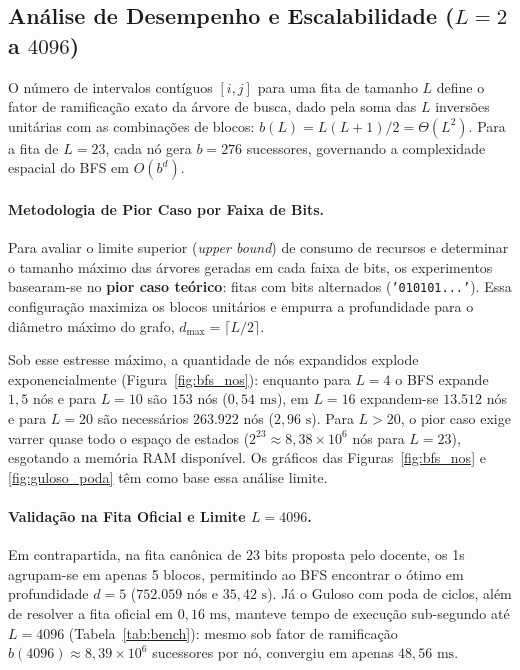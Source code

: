 \documentclass[
	12pt,
	a4paper,
	article,
	twocolumn,
	brazil
]{abntex2}
\begin{document}
\subsection{Análise de Desempenho e Escalabilidade (\texorpdfstring{$L = 2$ a $4096$}{L=2 a 4096})}

O número de intervalos contíguos $[i, j]$ para uma fita de tamanho $L$ define o fator de ramificação exato da árvore de busca, dado pela soma das $L$ inversões unitárias com as combinações de blocos: $b(L) = L(L+1)/2 = \Theta(L^2)$. Para a fita de $L = 23$, cada nó gera $b = 276$ sucessores, governando a complexidade espacial do BFS em $O(b^d)$.

\paragraph{Metodologia de Pior Caso por Faixa de Bits.}
Para avaliar o limite superior (\textit{upper bound}) de consumo de recursos e determinar o tamanho máximo das árvores geradas em cada faixa de bits, os experimentos basearam-se no \textbf{pior caso teórico}: fitas com bits alternados (\texttt{'010101...'}). Essa configuração maximiza os blocos unitários e empurra a profundidade para o diâmetro máximo do grafo, $d_{\max} = \lceil L/2 \rceil$.

Sob esse estresse máximo, a quantidade de nós expandidos explode exponencialmente (Figura~\ref{fig:bfs_nos}): enquanto para $L=4$ o BFS expande $1{,}5$ nós e para $L=10$ são $153$ nós ($0{,}54\text{ ms}$), em $L=16$ expandem-se $13.512$ nós e para $L=20$ são necessários $263.922$ nós ($2{,}96\text{ s}$). Para $L > 20$, o pior caso exige varrer quase todo o espaço de estados ($2^{23} \approx 8{,}38 \times 10^6$ nós para $L=23$), esgotando a memória RAM disponível. Os gráficos das Figuras~\ref{fig:bfs_nos} e \ref{fig:guloso_poda} têm como base essa análise limite.

\paragraph{Validação na Fita Oficial e Limite \texorpdfstring{$L = 4096$}{L=4096}.}
Em contrapartida, na fita canônica de $23$ bits proposta pelo docente, os 1s agrupam-se em apenas 5 blocos, permitindo ao BFS encontrar o ótimo em profundidade $d = 5$ ($752.059$ nós e $35{,}42\text{ s}$). Já o Guloso com poda de ciclos, além de resolver a fita oficial em $0{,}16\text{ ms}$, manteve tempo de execução sub-segundo até $L = 4096$ (Tabela~\ref{tab:bench}): mesmo sob fator de ramificação $b(4096) \approx 8{,}39 \times 10^6$ sucessores por nó, convergiu em apenas $48{,}56\text{ ms}$.
\end{document}
